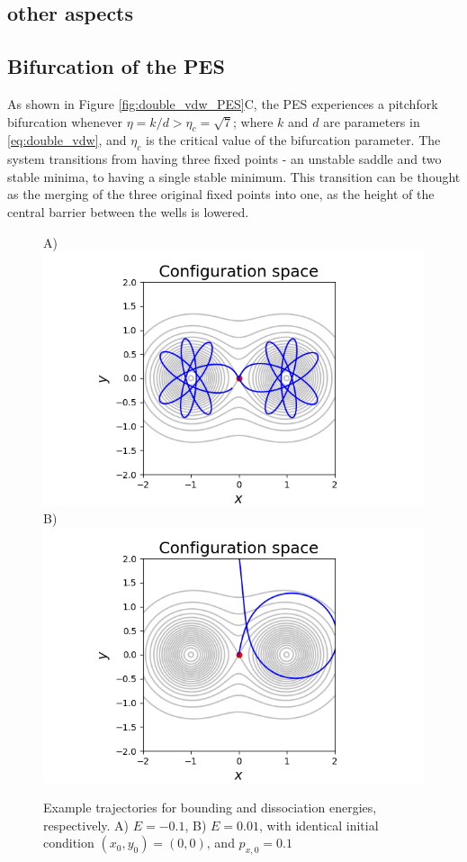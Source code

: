 \documentclass[10pt,aps,onecolumn,superscriptaddress]{revtex4-2}
\begin{document}
\newpage

\subsection{other aspects}

\subsection{Bifurcation of the PES}

As shown in Figure \ref{fig:double_vdw_PES}C, the PES experiences a pitchfork bifurcation whenever $\eta = k/d  > \eta_c = \sqrt{7}$; where $k$ and $d$ are parameters in \eqref{eq:double_vdw}, and $\eta_c$ is the critical value of the bifurcation parameter. The system transitions from having three fixed points - an unstable saddle and two stable minima, to having a single stable minimum. This transition can be thought as the merging of the three original fixed points into one, as the height of the central barrier between the wells is lowered. 



\begin{figure}
    \centering
    A)\includegraphics{traj_type2.png}
    B)\includegraphics{traj_escapping.png}
    \caption{Example trajectories for bounding and dissociation energies, respectively. A) $E = -0.1$, B) $E=0.01$, with identical initial condition $(x_0, y_0) = (0, 0)$, and $p_{x,0} = 0.1$}
    \label{fig:my_label}
\end{figure}
\end{document}
